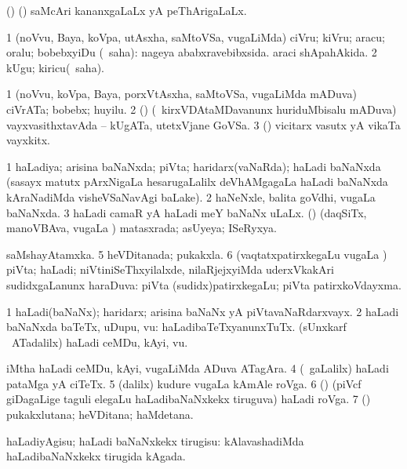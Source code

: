 \bentry
{} 
\gl{\nA} 
\bmng
(\ame) (\ashi) saMcAri kananxgaLaLx yA peThArigaLaLx.
\emng
\eentry

\bentry
{} 
\gl{\sakirx} 
\bmng
\bnum
\num{1} (noVvu, Baya, koVpa, utAsxha, saMtoVSa, \mo vugaLiMda) ciVru; kiVru; aracu; oralu; bobebxyiDu (\akirx\ saha):  nageya ababxravebibxsida.  araci shApahAkida. 
\num{2} kUgu; kiricu(\akirx\ saha).
\enum
\emng
\eentry

\bentry
{} 
\gl{\nA} 
\bmng
\bnum
\num{1} (noVvu, koVpa, Baya, porxVtAsxha, saMtoVSa, \mo vugaLiMda mADuva) ciVrATa; bobebx; huyilu. 
\num{2} (\ame) (\kanmu\ kirxVDAtaMDavanunx huriduMbisalu mADuva) vayxvasithxtavAda -- kUgATa, utetxVjane GoVSa.
\num{3} (\ashi) vicitarx vasutx yA vikaTa vayxkitx.
\enum
\emng
\eentry

\bentry
{} 
\gl{\gu} 
\bmng
\bnum
\num{1} haLadiya; arisina baNaNxda; piVta; haridarx(vaNaRda); haLadi baNaNxda (sasayx matutx pArxNigaLa hesarugaLalilx deVhAMgagaLa haLadi baNaNxda  kAraNadiMda visheVSaNavAgi baLake). 
\num{2} haNeNxle, balita goVdhi, \mo vugaLa baNaNxda. 
\num{3} haLadi camaR yA haLadi meY baNaNx uLaLx. 
 (\rUpa) (daqSiTx, manoVBAva, \mo vugaLa \vi) 
\banum
{} matasxrada; asUyeya; ISeRyxya.

 saMshayAtamxka. 
\eanum
\numie
\num{5} heVDitanada; pukakxla. 
\num{6} (vaqtatxpatirxkegaLu \mo vugaLa \vi) piVta; haLadi; niVtiniSeThxyilalxde, nilaRjejxyiMda uderxVkakAri sudidxgaLanunx haraDuva:  piVta (sudidx)patirxkegaLu; piVta patirxkoVdayxma.
\enum
\emng 
\eentry

\bentry
{} 
\gl{\nA} 
\bmng
\bnum
\num{1} haLadi(baNaNx); haridarx; arisina baNaNx yA piVtavaNaRdarxvayx. 
\num{2} haLadi baNaNxda baTeTx, uDupu, \mo vu:  haLadibaTeTxyanunxTuTx. 
 (sUnxkarf \mo\ ATadalilx) 
\banum
{} haLadi ceMDu, kAyi, \mo vu. 

 iMtha haLadi ceMDu, kAyi, \mo vugaLiMda ADuva ATagAra. 
\eanum
\numie
\num{4} (\sA\ \saMpa gaLalilx) haLadi pataMga yA ciTeTx. 
\num{5} (\bava dalilx) kudure \mo vugaLa kAmAle roVga. 
\num{6} (\ame) (piVcf giDagaLige taguli elegaLu haLadibaNaNxkekx tiruguva) haLadi roVga. 
\num{7} (\AmA) pukakxlutana; heVDitana; haMdetana.
\enum
\emng
\eentry

\bentry
{} 
\gl{\sakirx} 
\bmng
haLadiyAgisu; haLadi baNaNxkekx tirugisu:  kAlavashadiMda haLadibaNaNxkekx tirugida kAgada.
\emng

